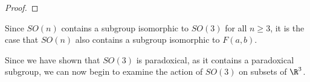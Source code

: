 \begin{proof}
\end{proof}
\begin{remark}
  Since $SO(n)$ contains a subgroup isomorphic to $SO(3)$ for all $n\geq 3$, it is the case that $SO(n)$ also contains a subgroup isomorphic to $F(a,b)$.
\end{remark}
Since we have shown that $SO(3)$ is paradoxical, as it contains a paradoxical subgroup, we can now begin to examine the action of $SO(3)$ on subsets of $\R^3$.
